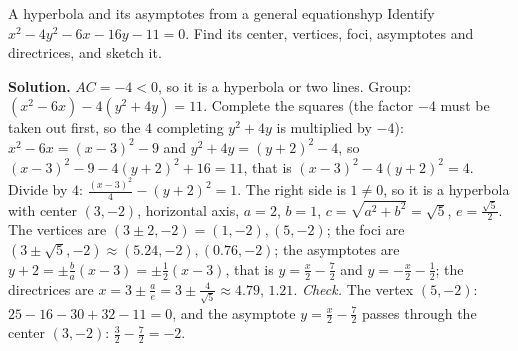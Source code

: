 \documentclass[11pt]{article}
\begin{document}
\begin{exmp}{A hyperbola and its asymptotes from a general equation}{shyp}
Identify $x^2-4y^2-6x-16y-11=0$. Find its center, vertices, foci, asymptotes and directrices, and sketch it.

\textbf{Solution.} $AC=-4<0$, so it is a hyperbola or two lines. Group: $\left(x^2-6x\right)-4\left(y^2+4y\right)=11$. Complete the squares (the factor $-4$ must be taken out first, so the $4$ completing $y^2+4y$ is multiplied by $-4$): $x^2-6x=(x-3)^2-9$ and $y^2+4y=(y+2)^2-4$, so $(x-3)^2-9-4(y+2)^2+16=11$, that is $(x-3)^2-4(y+2)^2=4$. Divide by $4$: $\frac{(x-3)^2}4-(y+2)^2=1$. The right side is $1\ne0$, so it is a hyperbola with center $(3,-2)$, horizontal axis, $a=2$, $b=1$, $c=\sqrt{a^2+b^2}=\sqrt5$, $e=\frac{\sqrt5}2$. The vertices are $(3\pm2,-2)=(1,-2),(5,-2)$; the foci are $\left(3\pm\sqrt5,-2\right)\approx(5.24,-2),(0.76,-2)$; the asymptotes are $y+2=\pm\frac ba(x-3)=\pm\frac12(x-3)$, that is $y=\frac x2-\frac72$ and $y=-\frac x2-\frac12$; the directrices are $x=3\pm\frac ae=3\pm\frac4{\sqrt5}\approx4.79,\,1.21$.
\emph{Check.} The vertex $(5,-2)$: $25-16-30+32-11=0$, and the asymptote $y=\frac x2-\frac72$ passes through the center $(3,-2)$: $\frac32-\frac72=-2$.


\end{exmp}
\end{document}
